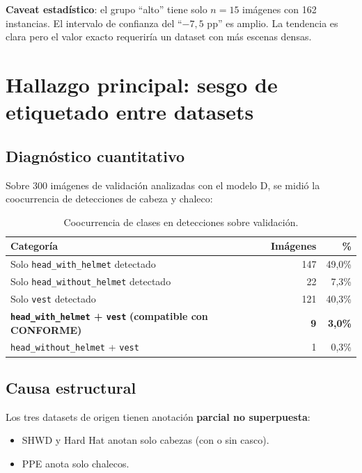 \documentclass[11pt,a4paper]{article}
\begin{document}
\begin{nota}
\textbf{Caveat estadístico}: el grupo ``alto'' tiene solo $n=15$
imágenes con 162 instancias. El intervalo de confianza del
``$-7{,}5$ pp'' es amplio. La tendencia es clara pero el valor
exacto requeriría un dataset con más escenas densas.
\end{nota}

\section{Hallazgo principal: sesgo de etiquetado entre datasets}
\label{sec:sesgo}

\subsection{Diagnóstico cuantitativo}

Sobre 300 imágenes de validación analizadas con el modelo D, se midió
la coocurrencia de detecciones de cabeza y chaleco:

\begin{table}[H]
\centering
\caption{Coocurrencia de clases en detecciones sobre validación.}
\begin{tabular}{l r r}
\toprule
\textbf{Categoría} & \textbf{Imágenes} & \textbf{\%} \\
\midrule
Solo \texttt{head\_with\_helmet} detectado & 147 & 49{,}0\% \\
Solo \texttt{head\_without\_helmet} detectado & 22 & 7{,}3\% \\
Solo \texttt{vest} detectado & 121 & 40{,}3\% \\
\textbf{\texttt{head\_with\_helmet} + \texttt{vest}}
\textbf{(compatible con CONFORME)} & \textbf{9} & \textbf{3{,}0\%} \\
\texttt{head\_without\_helmet} + \texttt{vest} & 1 & 0{,}3\% \\
\bottomrule
\end{tabular}
\end{table}

\subsection{Causa estructural}

Los tres datasets de origen tienen anotación \textbf{parcial no
superpuesta}:
\begin{itemize}[leftmargin=*]
    \item SHWD y Hard Hat anotan solo cabezas (con o sin casco).
    \item PPE anota solo chalecos.
\end{itemize}
\end{document}
